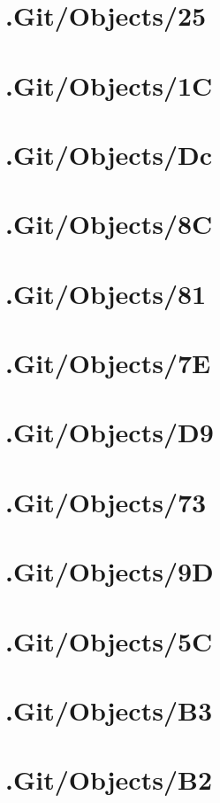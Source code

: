 \section*{.Git/Objects/25}

\section*{.Git/Objects/1C}

\section*{.Git/Objects/Dc}

\section*{.Git/Objects/8C}

\section*{.Git/Objects/81}

\section*{.Git/Objects/7E}

\section*{.Git/Objects/D9}

\section*{.Git/Objects/73}

\section*{.Git/Objects/9D}

\section*{.Git/Objects/5C}

\section*{.Git/Objects/B3}

\section*{.Git/Objects/B2}

